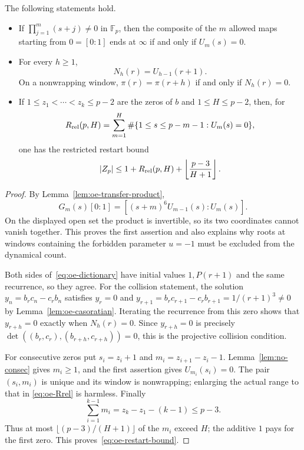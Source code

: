 \begin{proposition}
\label{prop:oe-restart-dictionary}
The following statements hold.
\begin{itemize}
\item If $\prod_{j=1}^m(s+j)\ne0$ in $\mathbb F_p$, then the composite of
the $m$ allowed maps starting from $0=[0:1]$ ends at $\infty$ if and only if
$U_m(s)=0$.
\item For every $h\ge1$,
\begin{equation}\label{eq:oe-dictionary}
 \boxed{N_h(r)=U_{h-1}(r+1).}
\end{equation}
On a nonwrapping window, $\pi(r)=\pi(r+h)$ if and only if $N_h(r)=0$.
\item If $1\le z_1<\cdots<z_k\le p-2$ are the zeros of $b$ and
$1\le H\le p-2$, then, for
\begin{equation}\label{eq:oe-Rrel}
 R_{\rm rel}(p,H)=\sum_{m=1}^H
 \#\{1\le s\le p-m-1:U_m(s)=0\},
\end{equation}
one has the restricted restart bound
\begin{equation}\label{eq:oe-restart-bound}
 |Z_p|\le1+R_{\rm rel}(p,H)
 +\left\lfloor\frac{p-3}{H+1}\right\rfloor.
\end{equation}
\end{itemize}
\end{proposition}

\begin{proof}
By Lemma~\ref{lem:oe-transfer-product},
\[
 G_m(s)[0:1]=[(s+m)^6U_{m-1}(s):U_m(s)].
\]
On the displayed open set the product is invertible, so its two coordinates
cannot vanish together.  This proves the first assertion and also explains
why roots at windows containing the forbidden parameter $u=-1$ must be
excluded from the dynamical count.

Both sides of~\eqref{eq:oe-dictionary} have initial values $1,P(r+1)$ and
the same recurrence, so they agree.  For the collision statement, the
solution $y_n=b_rc_n-c_rb_n$ satisfies $y_r=0$ and
$y_{r+1}=b_rc_{r+1}-c_rb_{r+1}=1/(r+1)^3\ne0$ by
Lemma~\ref{lem:oe-casoratian}.  Iterating the recurrence from this zero shows
that $y_{r+h}=0$ exactly when $N_h(r)=0$.  Since
$y_{r+h}=0$ is precisely $\det((b_r,c_r),(b_{r+h},c_{r+h}))=0$, this is the
projective collision condition.

For consecutive zeros put $s_i=z_i+1$ and
$m_i=z_{i+1}-z_i-1$.  Lemma~\ref{lem:no-consec} gives $m_i\ge1$, and the
first assertion gives $U_{m_i}(s_i)=0$.  The pair $(s_i,m_i)$ is unique and
its window is nonwrapping; enlarging the actual range to that in
\eqref{eq:oe-Rrel} is harmless.  Finally
\[
 \sum_{i=1}^{k-1}m_i=z_k-z_1-(k-1)\le p-3.
\]
Thus at most $\lfloor(p-3)/(H+1)\rfloor$ of the $m_i$ exceed $H$; the
additive $1$ pays for the first zero.  This proves~\eqref{eq:oe-restart-bound}.
\end{proof}

